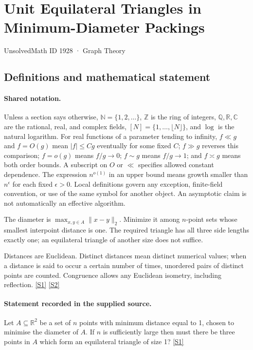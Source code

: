 \documentclass[11pt,a4paper]{article}
\newcommand{\N}{\mathbb{N}}
\newcommand{\Z}{\mathbb{Z}}
\newcommand{\Q}{\mathbb{Q}}
\newcommand{\R}{\mathbb{R}}
\newcommand{\C}{\mathbb{C}}
\newcommand{\sref}[2]{\hyperlink{source:#1:#2}{[S#2]}}
\begin{document}

\setcounter{section}{1927}

\section{Unit Equilateral Triangles in Minimum-Diameter Packings}\label{1928}

{\small\sffamily UnsolvedMath ID 1928 · Graph Theory}

\subsection{Definitions and mathematical statement}

\paragraph{Shared notation.}Unless a section says otherwise, $\N=\{1,2,\ldots\}$,
$\Z$ is the ring of integers, $\Q,\R,\C$ are the rational, real, and complex
fields, $[N]=\{1,\ldots,\lfloor N\rfloor\}$, and $\log$ is the natural
logarithm. For real functions of a parameter tending to infinity,
$f\ll g$ and $f=O(g)$ mean $|f|\leq Cg$ eventually for some fixed $C$;
$f\gg g$ reverses this comparison; $f=o(g)$ means $f/g\to0$;
$f\sim g$ means $f/g\to1$; and $f\asymp g$ means both order bounds.
A subscript on $O$ or $\ll$ specifies allowed constant dependence.
The expression $n^{o(1)}$ in an upper bound means growth smaller than
$n^\epsilon$ for each fixed $\epsilon>0$. Local definitions govern any
exception, finite-field convention, or use of the same symbol for another
object. An asymptotic claim is not automatically an effective algorithm.



The diameter is $\max_{x,y\in A}\|x-y\|_2$. Minimize it among $n$-point sets whose smallest interpoint distance is one. The required triangle has all three side lengths exactly one; an equilateral triangle of another size does not suffice.

Distances are Euclidean. Distinct distances mean distinct numerical values; when a distance is said to occur a certain number of times, unordered pairs of distinct points are counted. Congruence allows any Euclidean isometry, including reflection. \sref{1928}{1} \sref{1928}{2}

\paragraph{Statement recorded in the supplied source.}
Let $A\subseteq\mathbb{R}^2$ be a set of $n$ points with minimum distance equal to 1, chosen to minimise the diameter of $A$. If $n$ is sufficiently large then must there be three points in $A$ which form an equilateral triangle of size 1? \sref{1928}{1}
\end{document}
